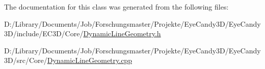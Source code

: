 The documentation for this class was generated from the following files\+:\begin{DoxyCompactItemize}
\item 
D\+:/\+Library/\+Documents/\+Job/\+Forschungsmaster/\+Projekte/\+Eye\+Candy3\+D/\+Eye\+Candy3\+D/include/\+E\+C3\+D/\+Core/\mbox{\hyperlink{_dynamic_line_geometry_8h}{Dynamic\+Line\+Geometry.\+h}}\item 
D\+:/\+Library/\+Documents/\+Job/\+Forschungsmaster/\+Projekte/\+Eye\+Candy3\+D/\+Eye\+Candy3\+D/src/\+Core/\mbox{\hyperlink{_dynamic_line_geometry_8cpp}{Dynamic\+Line\+Geometry.\+cpp}}\end{DoxyCompactItemize}
